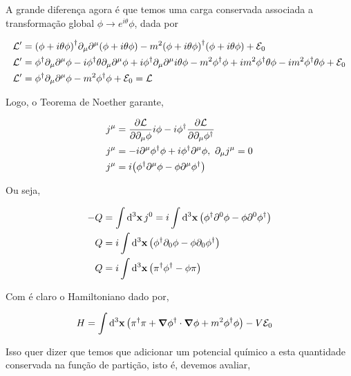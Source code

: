 \documentclass[twoside]{amsart}
\numberwithin{equation}{section}
\begin{document}
A grande diferença agora é que temos uma carga conservada associada a transformação global $\phi\rightarrow e^{i\theta}\phi$, dada por

\begin{align}
    \mathcal L'&=\qty(\phi+i\theta\phi)^\dagger\partial_\mu\partial^\mu\qty(\phi+i\theta\phi)-m^2\qty(\phi+i\theta\phi)^\dagger\qty(\phi+i\theta\phi)+\mathcal E_0\\
    \mathcal L'&=\phi^\dagger\partial_\mu\partial^\mu\phi-i\phi^\dagger\theta\partial_\mu\partial^\mu\phi+i\phi^\dagger\partial_\mu\partial^\mu i\theta\phi-m^2\phi^\dagger\phi+im^2\phi^\dagger\theta\phi-im^2\phi^\dagger\theta\phi+\mathcal E_0\\
    \mathcal L'&=\phi^\dagger\partial_\mu\partial^\mu\phi-m^2\phi^\dagger\phi+\mathcal E_0=\mathcal L
\end{align}

Logo, o Teorema de Noether garante,

\begin{align}
    j^\mu&=\pdv{\mathcal L}{\partial_\mu\phi}i\phi-i\phi^\dagger\pdv{\mathcal L}{\partial_\mu\phi^\dagger}\\
    j^\mu&=-i\partial^\mu\phi^\dagger\phi+i\phi^\dagger\partial^\mu\phi,\ \partial_\mu j^\mu=0\\
    j^\mu&=i\qty(\phi^\dagger\partial^\mu\phi-\phi\partial^\mu\phi^\dagger)
\end{align}

Ou seja,

\begin{align}
    -Q&=\int\dd[3]{\vb x}j^0=i\int\dd[3]{\vb x}\qty(\phi^\dagger\partial^0\phi-\phi\partial^0\phi^\dagger)\\
    Q&=i\int\dd[3]{\vb x}\qty(\phi^\dagger\partial_0\phi-\phi\partial_0\phi^\dagger)\\
    Q&=i\int\dd[3]{\vb x}\qty(\pi^\dagger\phi^\dagger-\phi\pi)
\end{align}

Com é claro o Hamiltoniano dado por,

\begin{align}
    H&=\int\dd[3]{\vb x}\qty(\pi^\dagger\pi+\grad\phi^\dagger\cdot\grad\phi+m^2\phi^\dagger\phi)-V\mathcal E_0
\end{align}

Isso quer dizer que temos que adicionar um potencial químico a esta quantidade conservada na função de partição, isto é, devemos avaliar,
\end{document}
